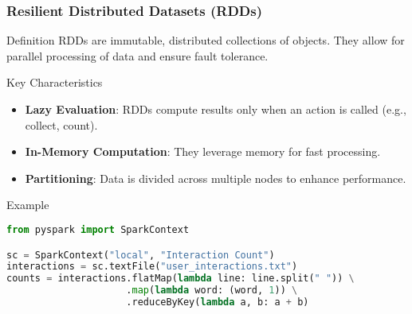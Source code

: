 \documentclass[aspectratio=169]{beamer}
\begin{document}
\begin{frame}[fragile]
    \frametitle{Resilient Distributed Datasets (RDDs)}
    \begin{block}{Definition}
        RDDs are immutable, distributed collections of objects. They allow for parallel processing of data and ensure fault tolerance.
    \end{block}
    
    \begin{block}{Key Characteristics}
        \begin{itemize}
            \item \textbf{Lazy Evaluation}: RDDs compute results only when an action is called (e.g., collect, count).
            \item \textbf{In-Memory Computation}: They leverage memory for fast processing.
            \item \textbf{Partitioning}: Data is divided across multiple nodes to enhance performance.
        \end{itemize}
    \end{block}

    \begin{block}{Example}
        \begin{lstlisting}[language=Python]
from pyspark import SparkContext

sc = SparkContext("local", "Interaction Count")
interactions = sc.textFile("user_interactions.txt")
counts = interactions.flatMap(lambda line: line.split(" ")) \
                     .map(lambda word: (word, 1)) \
                     .reduceByKey(lambda a, b: a + b)
        \end{lstlisting}
    \end{block}
\end{frame}
\end{document}
